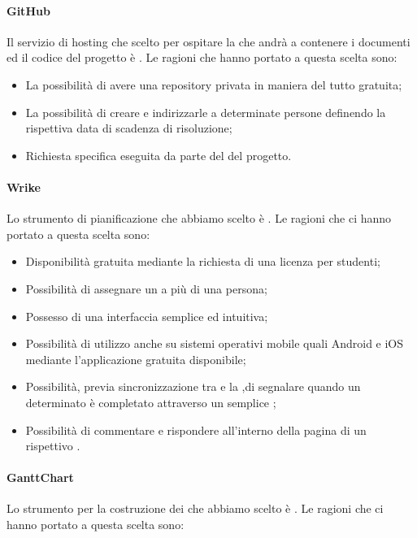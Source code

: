 \paragraph{GitHub}
Il servizio di hosting che scelto per ospitare la  che andrà a contenere i documenti ed il codice del progetto è .
Le ragioni che hanno portato a questa scelta sono:
\begin{itemize}
\item La possibilità di avere una repository privata in maniera del tutto gratuita; 
\item La possibilità di creare  e indirizzarle a determinate persone definendo la rispettiva data di scadenza di risoluzione;
\item Richiesta specifica eseguita da parte del  del progetto.
\end{itemize}

\paragraph{Wrike}
Lo strumento di pianificazione che abbiamo scelto è .
Le ragioni che ci hanno portato a questa scelta sono:

\begin{itemize}
\item Disponibilità gratuita mediante la richiesta di una licenza per studenti;
\item Possibilità di assegnare un  a più di una persona;
\item Possesso di una interfaccia semplice ed intuitiva;
\item Possibilità di utilizzo anche su sistemi operativi mobile quali Android e iOS mediante l'applicazione gratuita disponibile;
\item Possibilità, previa sincronizzazione tra  e la  ,di segnalare quando un determinato  è completato attraverso un semplice ;
\item Possibilità di commentare e rispondere all'interno della pagina di un rispettivo .

\end{itemize}

\paragraph{GanttChart}
Lo strumento per la costruzione dei  che abbiamo scelto è .
Le ragioni che ci hanno portato a questa scelta sono:

